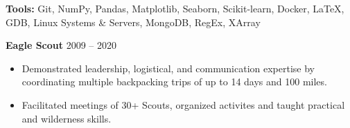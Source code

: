 \documentclass{article}
\begin{document}
    \vspace{2mm}

    \noindent \textbf{Tools:} Git, NumPy, Pandas, Matplotlib, Seaborn, Scikit-learn, Docker, \LaTeX, GDB, Linux Systems \& Servers, MongoDB, RegEx, XArray



    
    \noindent \textbf{Eagle Scout} \hfill 2009 -- 2020
    \begin{itemize}
        \item Demonstrated leadership, logistical, and communication expertise by coordinating multiple backpacking trips of up to 14 days and 100 miles.
        \item Facilitated meetings of 30+ Scouts, organized activites and taught practical and wilderness skills.
    \end{itemize}
    
\end{document}
